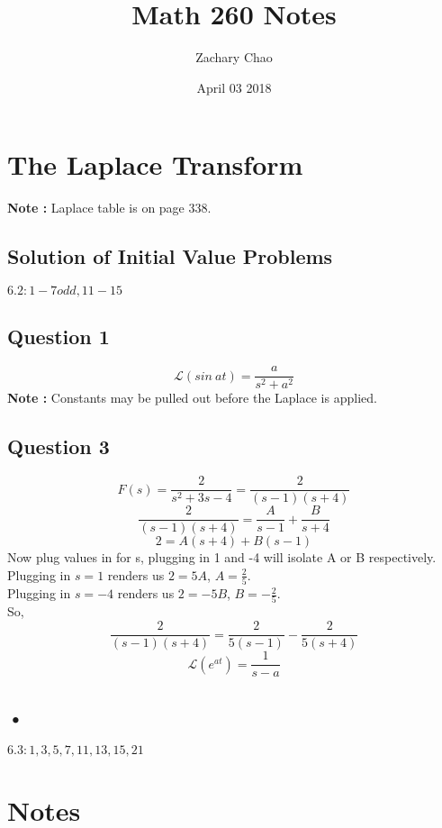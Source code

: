 \documentclass[12pt, letterpaper, twoside]{article}
\title{Math 260 Notes}
\author{Zachary Chao}
\date{April 03 2018}
\newcommand{\laplace}{\mathcal{L}}
\begin{document}
  \setcounter{section}{5}
  \section{The Laplace Transform}
    \textbf{Note : } Laplace table is on page 338.
    \setcounter{subsection}{1}
    \subsection{Solution of Initial Value Problems}
      $6.2 : 1-7odd, 11-15$\\
      \subsection*{Question 1}
        $$\laplace (sin \ at) = \frac{a}{s^2 + a^2}$$
        \textbf{Note :} Constants may be pulled out before the Laplace is applied.
       \subsection*{Question 3}
         $$F(s) = \frac{2}{s^2+3s-4} = \frac{2}{(s-1)(s+4)}$$
         $$\frac{2}{(s-1)(s+4)} = \frac{A}{s-1} + \frac{B}{s+4}$$
         $$2 = A(s+4) + B(s-1)$$
         Now plug values in for s, plugging in 1 and -4 will isolate A or B respectively.\\
         Plugging in $s = 1$ renders us $2 = 5A$, $A = \frac{2}{5}$.\\
         Plugging in $s = -4$ renders us $2 = -5B$, $B = -\frac{2}{5}$.\\
         So, 
         $$\frac{2}{(s-1)(s+4)} = \frac{2}{5(s-1)} - \frac{2}{5(s+4)}$$
         $$\laplace (e^{at}) = \frac{1}{s-a}$$
         
     
    \subsection{•}
      $6.3 : 1,3,5,7,11,13,15,21$\\
      
      
    \section*{Notes}
\end{document}

